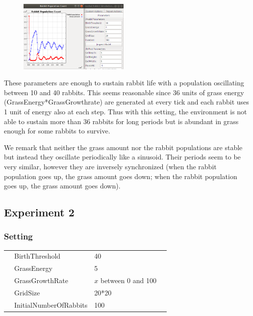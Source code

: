 \documentclass[11pt]{article}
\begin{document}
 \begin{figure}
  \vspace{-20pt}
  \begin{center}
    \includegraphics[width=0.48\textwidth]{exp1.png}
  \end{center}
  \vspace{-20pt}
\end{figure}
 
 These parameters are enough to sustain rabbit life with a population oscillating between 10 and 40 rabbits. This seems reasonable since 36 units of grass energy (GrassEnergy*GrassGrowthrate) are generated at every tick and each rabbit uses 1 unit of energy also at each step. Thus with this setting, the environment is not able to sustain more than 36 rabbits for long periods but is abundant in grass enough for some rabbits to survive.

 We remark that neither the grass amount nor the rabbit populations are stable but instead they oscillate periodically like a sinusoid. Their periods seem to be very similar, however they are inversely synchronized (when the rabbit population goes up, the grass amount goes down; when the rabbit population goes up, the grass amount goes down).


 \subsection{Experiment 2}
 \subsubsection{Setting}

 \begin{table}[H]
  \begin{tabular}{llll}
   &BirthThreshold  &40\\
   &GrassEnergy  &5 \\
   &GrassGrowthRate  &$x$ between 0 and 100\\
   &GridSize  &20*20\\
   &InitialNumberOfRabbits  &100
  \end{tabular}
 \end{table}
\end{document}

